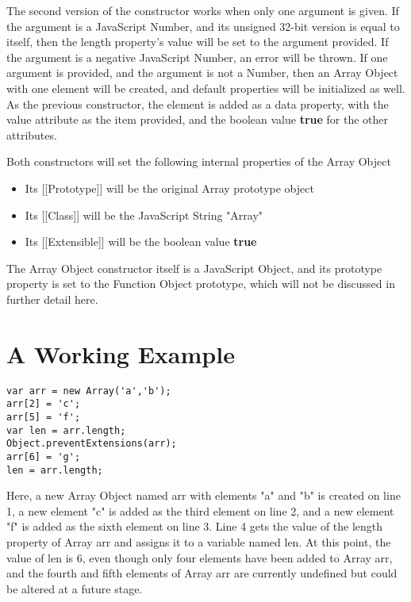 \documentclass[a4paper,11pt,twoside]{report}
\begin{document}
The second version of the constructor works when only one argument is given. If the argument is a JavaScript Number, and its unsigned 32-bit version is equal to itself, then the length property's value will be set to the argument provided. If the argument is a negative JavaScript Number, an error will be thrown. If one argument is provided, and the argument is not a Number, then an Array Object with one element will be created, and default properties will be initialized as well. As the previous constructor, the element is added as a data property, with the value attribute as the item provided, and the boolean value \textbf{true} for the other attributes. 

Both constructors will set the following internal properties of the Array Object
\begin{itemize}
\item Its [[Prototype]] will be the original Array prototype object
\item Its [[Class]] will be the JavaScript String "Array"
\item Its [[Extensible]] will be the boolean value \textbf{true}
\end{itemize}

The Array Object constructor itself is a JavaScript Object, and its prototype property is set to the Function Object prototype, which will not be discussed in further detail here.

\section{A Working Example}
\begin{center}
\begin{minipage}{10cm}
\begin{lstlisting}
var arr = new Array('a','b');
arr[2] = 'c';
arr[5] = 'f';
var len = arr.length;
Object.preventExtensions(arr);
arr[6] = 'g';
len = arr.length;
\end{lstlisting}
\end{minipage}
\end{center}

Here, a new Array Object named arr with elements "a" and "b" is created on line 1, a new element "c" is added as the third element on line 2, and a new element "f" is added as the sixth element on line 3. Line 4 gets the value of the length property of Array arr and assigns it to a variable named len. At this point, the value of len is 6, even though only four elements have been added to Array arr, and the fourth and fifth elements of Array arr are currently undefined but could be altered at a future stage.
\end{document}
